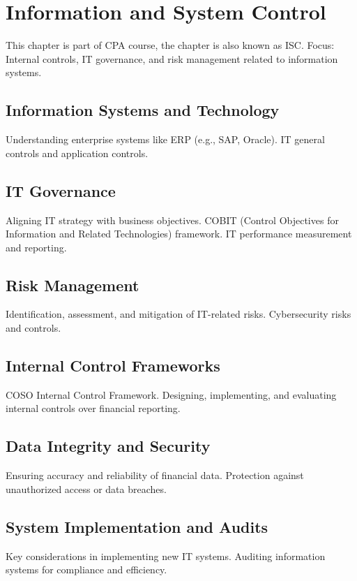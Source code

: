 \chapter{Information and System Control}
This chapter is part of CPA course, the chapter is also known as ISC.
Focus: Internal controls, IT governance, and risk management related to information systems.

\section{Information Systems and Technology}
Understanding enterprise systems like ERP (e.g., SAP, Oracle).
IT general controls and application controls.

\section{IT Governance}
Aligning IT strategy with business objectives.
COBIT (Control Objectives for Information and Related Technologies) framework.
IT performance measurement and reporting.

\section{Risk Management}
Identification, assessment, and mitigation of IT-related risks.
Cybersecurity risks and controls.

\section{Internal Control Frameworks}
COSO Internal Control Framework.
Designing, implementing, and evaluating internal controls over financial reporting.

\section{Data Integrity and Security}
Ensuring accuracy and reliability of financial data.
Protection against unauthorized access or data breaches.

\section{System Implementation and Audits}
Key considerations in implementing new IT systems.
Auditing information systems for compliance and efficiency.